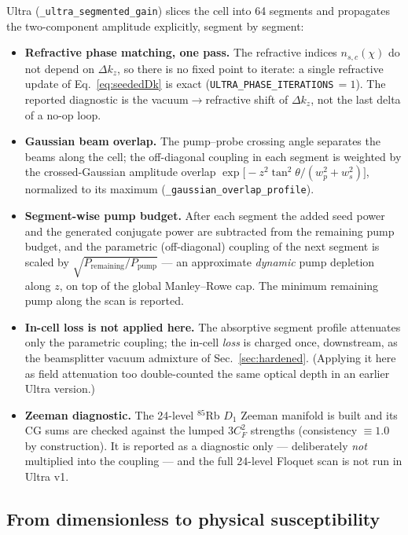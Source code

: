 \documentclass[11pt]{article}
\newcommand{\code}[1]{\texttt{#1}}
\begin{document}
Ultra (\code{\_ultra\_segmented\_gain}) slices the cell into 64 segments and
propagates the two-component amplitude explicitly, segment by segment:
\begin{itemize}[leftmargin=1.6em]
  \item \textbf{Refractive phase matching, one pass.} The refractive indices
  $n_{s,c}(\chi)$ do not depend on $\Delta k_z$, so there is no fixed point to
  iterate: a single refractive update of Eq.~\eqref{eq:seededDk} is exact
  (\code{ULTRA\_PHASE\_ITERATIONS}\,$=1$). The reported diagnostic is the
  vacuum$\to$refractive shift of $\Delta k_z$, not the last delta of a no-op
  loop.
  \item \textbf{Gaussian beam overlap.} The pump--probe crossing angle
  separates the beams along the cell; the off-diagonal coupling in each
  segment is weighted by the crossed-Gaussian amplitude overlap
  $\exp\!\big[-z^2\tan^2\theta/(w_p^2+w_s^2)\big]$, normalized to its maximum
  (\code{\_gaussian\_overlap\_profile}).
  \item \textbf{Segment-wise pump budget.} After each segment the added seed
  power and the generated conjugate power are subtracted from the remaining
  pump budget, and the parametric (off-diagonal) coupling of the next segment
  is scaled by $\sqrt{P_{\text{remaining}}/P_{\text{pump}}}$ --- an approximate
  \emph{dynamic} pump depletion along $z$, on top of the global Manley--Rowe
  cap. The minimum remaining pump along the scan is reported.
  \item \textbf{In-cell loss is not applied here.} The absorptive segment
  profile attenuates only the parametric coupling; the in-cell \emph{loss} is
  charged once, downstream, as the beamsplitter vacuum admixture of
  Sec.~\ref{sec:hardened}. (Applying it here as field attenuation too
  double-counted the same optical depth in an earlier Ultra version.)
  \item \textbf{Zeeman diagnostic.} The 24-level $^{85}$Rb $D_1$ Zeeman
  manifold is built and its CG sums are checked against the lumped $3C_F^2$
  strengths (consistency $\equiv1.0$ by construction). It is reported as a
  diagnostic only --- deliberately \emph{not} multiplied into the coupling ---
  and the full 24-level Floquet scan is not run in Ultra v1.
\end{itemize}

\subsection{From dimensionless to physical susceptibility}
\label{sec:coupling}
\end{document}
